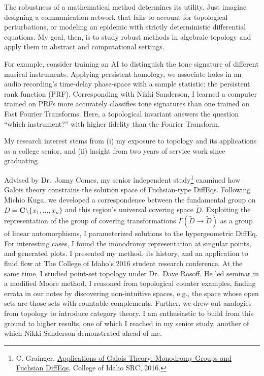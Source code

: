 The robustness of a mathematical method determines its utility. Just
imagine designing a communication network that fails to account for
topological perturbations, or modeling an epidemic with strictly
deterministic differential equations. My goal, then, is to study robust
methods in algebraic topology and apply them in abstract and
computational settings.

For example, consider training an AI to distinguish the tone signature
of different musical instruments. Applying persistent homology, we
associate holes in an audio recording's time-delay phase-space with a
sample statistic: the persistent rank function (PRF). Corresponding with
Nikki Sanderson, I learned a computer trained on PRFs more accurately
classifies tone signatures than one trained on Fast Fourier Transforms.
Here, a topological invariant answers the question ``which instrument?''
with higher fidelity than the Fourier Transform.

My research interest stems from (i) my exposure to topology and its
applications as a college senior, and (ii) insight from two years of
service work since graduating.

Advised by Dr.~Jonny Comes, my senior independent study\footnote{C.
  Grainger,
  \href{http://coltongrainger.com/documents/cgrainger_coursework_galois_poster.pdf}{Applications
  of Galois Theory: Monodromy Groups and Fuchsian DiffEqs}, College of
  Idaho SRC, 2016.} examined how Galois theory constrains the solution
space of Fuchsian-type DiffEqs. Following Michio Kuga, we developed a
correspondence between the fundamental group on
\(D = \mathbf{C}\setminus\{x_1,\ldots,x_n\}\) and this region's
universal covering space \(\tilde{D}\). Exploiting the representation of
the group of covering transformations
\(\Gamma(\tilde{D} \to \tilde{D})\) as a group of linear automorphisms,
I parameterized solutions to the hypergeometric DiffEq. For interesting
cases, I found the monodromy representation at singular points, and
generated plots. I presented my method, its history, and an application
to fluid flow at The College of Idaho's 2016 student research
conference. At the same time, I studied point-set topology under
Dr.~Dave Rosoff. He led seminar in a modified Moore method. I reasoned
from topological counter examples, finding errata in our notes by
discovering non-intuitive spaces, e.g., the space whose open sets are
those sets with countable complements. Further, we drew out analogies
from topology to introduce category theory. I am enthusiastic to build
from this ground to higher results, one of which I reached in my senior
study, another of which Nikki Sanderson demonstrated ahead of me.

